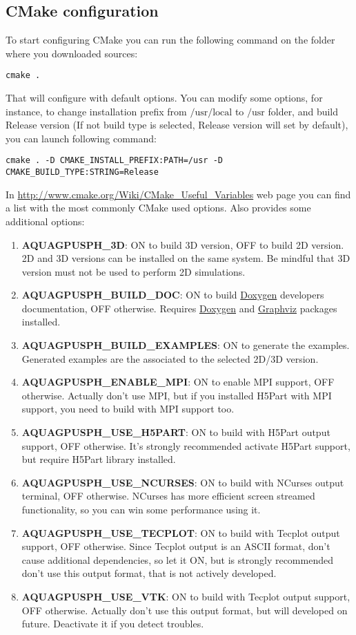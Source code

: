 \subsection{CMake configuration}
\label{sss:install:cmake}
%
To start configuring CMake you can run the following command on the folder where
you downloaded \NAME sources:
%
\begin{verbatim}
cmake .
\end{verbatim}
%
That will configure \NAME with default options. You can modify some options, for
instance, to change installation prefix from $\mbox{/usr/local}$ to $\mbox{/usr}$
folder, and build Release version (If not build type is selected, Release version
will set by default), you can launch following command:
%
\begin{verbatim}
cmake . -D CMAKE_INSTALL_PREFIX:PATH=/usr -D CMAKE_BUILD_TYPE:STRING=Release
\end{verbatim}
%
In \url{http://www.cmake.org/Wiki/CMake_Useful_Variables} web page you can find a
list with the most commonly CMake used options. Also \NAME provides some additional
options:
%
\begin{enumerate}
	\item \textbf{AQUAGPUSPH\_3D}: ON to build 3D \NAME version, OFF to build 2D
	version. \NAME 2D and 3D versions can be installed on the same system. Be
	mindful that 3D version must not be used to perform 2D simulations.
	\item \textbf{AQUAGPUSPH\_BUILD\_DOC}: ON to build
	\href{http://www.doxygen.org}{Doxygen} developers documentation, OFF otherwise.
	Requires \href{http://www.doxygen.org}{Doxygen} and
	\href{www.graphviz.org}{Graphviz} packages installed.
	\item \textbf{AQUAGPUSPH\_BUILD\_EXAMPLES}: ON to generate the examples.
	Generated examples are the associated to the selected 2D/3D version.
	\item \textbf{AQUAGPUSPH\_ENABLE\_MPI}: ON to enable MPI support, OFF otherwise.
	Actually \NAME don't use MPI, but if you installed H5Part with MPI support, you
	need to build \NAME with MPI support too.
	\item \textbf{AQUAGPUSPH\_USE\_H5PART}: ON to build \NAME with H5Part output
	support, OFF otherwise. It's strongly recommended activate H5Part support, but
	require H5Part library installed.
	\item \textbf{AQUAGPUSPH\_USE\_NCURSES}: ON to build \NAME with NCurses output
	terminal, OFF otherwise. NCurses has more efficient screen streamed functionality,
	so you can win some performance using it.
	\item \textbf{AQUAGPUSPH\_USE\_TECPLOT}: ON to build \NAME with Tecplot output
	support, OFF otherwise. Since Tecplot output is an ASCII format, don't cause
	additional dependencies, so let it ON, but is strongly recommended don't use
	this output format, that is not actively developed.
	\item \textbf{AQUAGPUSPH\_USE\_VTK}: ON to build \NAME with Tecplot output
	support, OFF otherwise. Actually \NAME don't use this output format, but will
	developed on future. Deactivate it if you detect troubles.
\end{enumerate}
%
